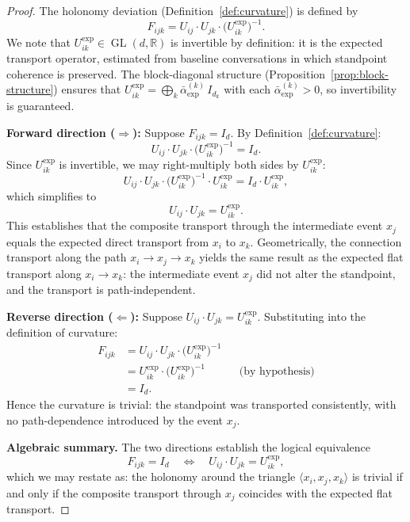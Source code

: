 \begin{proof}
The holonomy deviation (Definition~\ref{def:curvature}) is defined by
\[
    F_{ijk} = U_{ij} \cdot U_{jk} \cdot \big(U_{ik}^{\exp}\big)^{-1}.
\]
We note that $U_{ik}^{\exp} \in \operatorname{GL}(d, \mathbb{R})$ is invertible by
definition: it is the expected transport operator, estimated from baseline conversations
in which standpoint coherence is preserved. The block-diagonal structure
(Proposition~\ref{prop:block-structure}) ensures that $U_{ik}^{\exp} = \bigoplus_k
\bar{\alpha}^{(k)}_{\exp}\, I_{d_k}$ with each $\bar{\alpha}^{(k)}_{\exp} > 0$, so
invertibility is guaranteed.

\medskip\noindent\textbf{Forward direction ($\Rightarrow$):} Suppose $F_{ijk} = I_d$.
By Definition~\ref{def:curvature}:
\[
    U_{ij} \cdot U_{jk} \cdot \big(U_{ik}^{\exp}\big)^{-1} = I_d.
\]
Since $U_{ik}^{\exp}$ is invertible, we may right-multiply both sides by
$U_{ik}^{\exp}$:
\[
    U_{ij} \cdot U_{jk} \cdot \big(U_{ik}^{\exp}\big)^{-1} \cdot U_{ik}^{\exp}
    = I_d \cdot U_{ik}^{\exp},
\]
which simplifies to
\[
    U_{ij} \cdot U_{jk} = U_{ik}^{\exp}.
\]
This establishes that the composite transport through the intermediate event $x_j$ equals
the expected direct transport from $x_i$ to $x_k$. Geometrically, the connection transport
along the path $x_i \to x_j \to x_k$ yields the same result as the expected flat
transport along $x_i \to x_k$: the intermediate event $x_j$ did not alter the standpoint,
and the transport is path-independent.

\medskip\noindent\textbf{Reverse direction ($\Leftarrow$):} Suppose $U_{ij} \cdot U_{jk} =
U_{ik}^{\exp}$. Substituting into the definition of curvature:
\begin{align*}
    F_{ijk}
    &= U_{ij} \cdot U_{jk} \cdot \big(U_{ik}^{\exp}\big)^{-1} \\
    &= U_{ik}^{\exp} \cdot \big(U_{ik}^{\exp}\big)^{-1}
      && \text{(by hypothesis)} \\
    &= I_d.
\end{align*}
Hence the curvature is trivial: the standpoint was transported consistently, with no
path-dependence introduced by the event $x_j$.

\medskip\noindent\textbf{Algebraic summary.} The two directions establish the logical
equivalence
\[
    F_{ijk} = I_d
    \quad\Longleftrightarrow\quad
    U_{ij} \cdot U_{jk} = U_{ik}^{\exp},
\]
which we may restate as: the holonomy around the triangle $\langle x_i, x_j, x_k
\rangle$ is trivial if and only if the composite transport through $x_j$ coincides with
the expected flat transport.
\end{proof}

